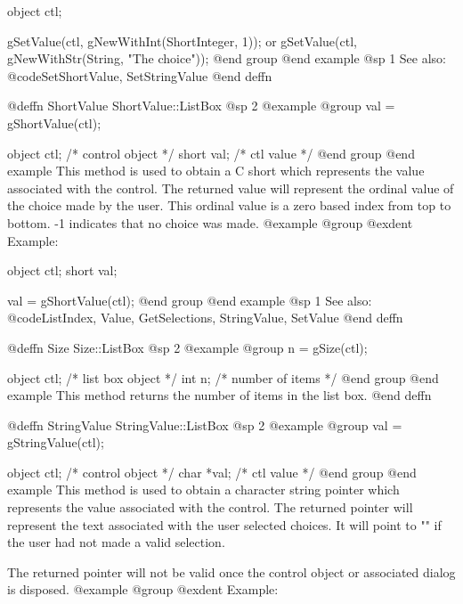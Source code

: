 {object  ctl;

gSetValue(ctl, gNewWithInt(ShortInteger, 1));
        or
gSetValue(ctl, gNewWithStr(String, "The choice"));
@end group
@end example
@sp 1
See also:  @code{SetShortValue, SetStringValue}
@end deffn













@deffn {ShortValue} ShortValue::ListBox
@sp 2
@example
@group
val = gShortValue(ctl);

object  ctl;   /*  control object  */
short   val;   /*  ctl value       */
@end group
@end example
This method is used to obtain a C short which represents the value
associated with the control.  The returned value will represent the
ordinal value of the choice made by the user.  This ordinal value is a
zero based index from top to bottom.  -1 indicates that no choice was
made.
@example
@group
@exdent Example:

object  ctl;
short   val;

val = gShortValue(ctl);
@end group
@end example
@sp 1
See also:  @code{ListIndex, Value, GetSelections, StringValue, SetValue}
@end deffn



@deffn {Size} Size::ListBox
@sp 2
@example
@group
n = gSize(ctl);

object  ctl;   /*  list box object   */
int     n;     /*  number of items   */
@end group
@end example
This method returns the number of items in the list box.
@end deffn










@deffn {StringValue} StringValue::ListBox
@sp 2
@example
@group
val = gStringValue(ctl);

object  ctl;   /*  control object  */
char    *val;  /*  ctl value       */
@end group
@end example
This method is used to obtain a character string pointer which
represents the value associated with the control.  The returned pointer
will represent the text associated with the user selected choices.
It will point to "" if the user had not made a valid selection.

The returned pointer will not be valid once the control object or
associated dialog is disposed.
@example
@group
@exdent Example:

}
